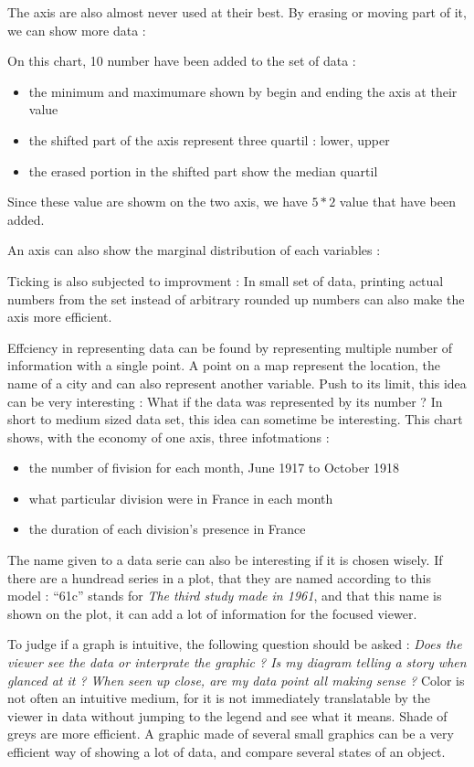The axis are also almost never used at their best. By erasing or moving part of it, we can show more data : 


On this chart, 10 number have been added to the set of data : 
\begin{itemize}
\item the minimum and maximumare shown by begin and ending the axis at their value
\item the shifted part of the axis represent three quartil : lower, upper
\item the erased portion in the shifted part show the median quartil
\end{itemize}
Since these value are showm on the two axis, we have $5*2$ value that have been added.

An axis can also show the marginal distribution of each variables :

Ticking is also subjected to improvment : In small set of data, printing actual numbers from the set instead of arbitrary rounded up numbers can also make the axis more efficient.

Effciency in representing data can be found by representing multiple number of information with a single point. A point on a map represent the location, the name of a city and can also represent another variable.
 Push to its limit, this idea can be very interesting : What if the data was represented by its number ? In short to medium sized data set, this idea can sometime be interesting.
 This chart shows, with the economy of one axis, three infotmations : 
\begin{itemize}
\item the number of fivision for each month, June 1917 to October 1918
\item what particular division were in France in each month
\item the duration of each division's presence in France
\end{itemize}
The name given to a data serie can also be interesting if it is chosen wisely.
 If there are a hundread series in a plot, that they are named according to this model : ``61c'' stands for \emph{The third study made in 1961}, and that this name is shown on the plot, it can add a lot of information for the focused viewer.

To judge if a graph is intuitive, the following question should be asked : \emph{Does the viewer see the data or interprate the graphic ? Is my diagram telling a story when glanced at it ? When seen up close, are my data point all making sense ?}
 Color is not often an intuitive medium, for it is not immediately translatable by the viewer in data without jumping to the legend and see what it means. Shade of greys are more efficient. A graphic made of several small graphics can be a very efficient way of showing a lot of data, and compare several states of an object.

